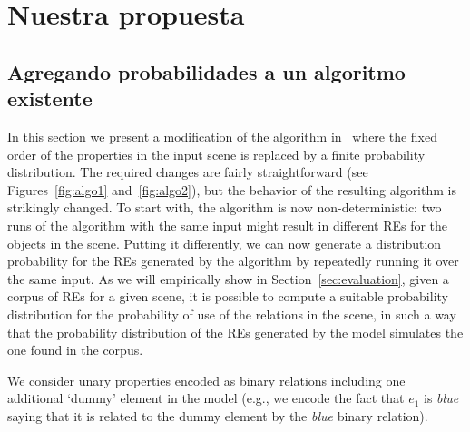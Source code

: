 \chapter{Nuestra propuesta}
\label{sec:algoritmo}
\section{Agregando probabilidades a un algoritmo existente}
In this section we present a modification of the algorithm
in~\cite{arec2:2008:Areces} where the fixed order of the properties in
the input scene is replaced by a finite probability distribution.  The
required changes are fairly straightforward (see
Figures~\ref{fig:algo1} and~\ref{fig:algo2}), but the behavior of the
resulting algorithm is strikingly changed. To start with, the
algorithm is now non-deterministic: two runs of the algorithm with the
same input might result in different REs for the objects in the scene.
Putting it differently, we can now generate a distribution probability
for the REs generated by the algorithm by repeatedly running it over
the same input.  As we will empirically show in
Section~\ref{sec:evaluation}, given a corpus of REs for a given scene,
it is possible to compute a suitable probability distribution for the
probability of use of the relations in the scene, in such a way that
the probability distribution of the REs generated by the model
simulates the one found in the corpus.

We consider unary properties encoded as binary relations including one
additional `dummy' element in the model (e.g., we encode the fact that
$e_1$ is \emph{blue} saying that it is related to the dummy element by
the \emph{blue} binary relation).



